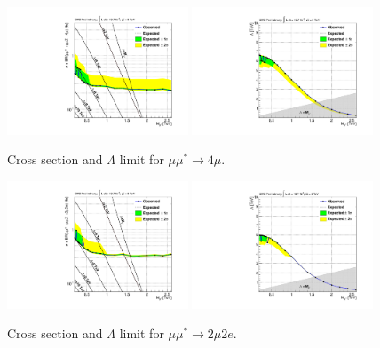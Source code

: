 \begin{figure}[hp!]
\begin{center}
\includegraphics[width=0.48\textwidth]{plot/limit_4mu.pdf}
\includegraphics[width=0.48\textwidth]{plot/limit_lambda_4mu.pdf}
\end{center}
\caption{\label{fig:limit4mu}Cross section and $\Lambda$ limit for $\mu\mu^{*} \rightarrow 4\mu$.}
\end{figure}

\begin{figure}[hp!]
\begin{center}
\includegraphics[width=0.48\textwidth]{plot/limit_2mu2e.pdf}
\includegraphics[width=0.48\textwidth]{plot/limit_lambda_2mu2e.pdf}
\end{center}
\caption{\label{fig:limit2mu2e}Cross section and $\Lambda$ limit for $\mu\mu^{*} \rightarrow 2\mu2e$.}
\end{figure}

